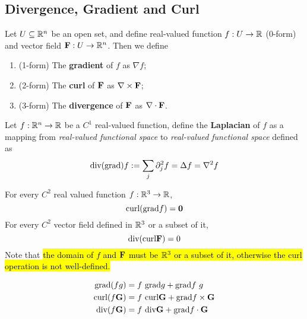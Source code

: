 \documentclass[11pt]{article}
\newcommand{\veG}[0]{\ve{G}}
\begin{document}
		\subsection{Divergence, Gradient and Curl}
			\begin{definition}
				Let $U \subseteq \mathbb{R}^n$ be an open set, and define real-valued function $f: U \to \mathbb{R}$ (0-form) and vector field $\textbf{F}: U \to \mathbb{R}^n$. Then we define
				\begin{enumerate}
					\item (1-form) The \textbf{gradient} of $f$ as $\nabla f$;
					\item (2-form) The \textbf{curl} of $\textbf{F}$ as $\nabla \times \textbf{F}$;
					\item (3-form) The \textbf{divergence} of $\textbf{F}$ as $\nabla \cdot \textbf{F}$.
				\end{enumerate}
			\end{definition}
			
			\begin{definition}
				Let $f: \mathbb{R}^n \to \mathbb{R}$ be a $C^1$ real-valued function, define the \textbf{Laplacian} of $f$ as a mapping from \emph{real-valued functional space} to \emph{real-valued functional space} defined as
				\begin{equation}
					\text{{div(grad)}} f := \sum_{j} \partial_j^2 f = \Delta f = \nabla^2 f
				\end{equation}
			\end{definition}
			
			\begin{theorem}
				For every $C^2$ real valued function $f: \mathbb{R}^3 \to \mathbb{R}$,
				\begin{equation}
					\text{curl}(\text{grad} f) = \textbf{0}
				\end{equation}
				For every $C^2$ vector field defined in $\mathbb{R}^3$ or a subset of it, 
				\begin{equation}
					\text{div} (\text{curl} \textbf{F}) = 0
				\end{equation}
				Note that \hl{the domain of $f$ and $\textbf{F}$ must be $\mathbb{R}^3$ or a subset of it, otherwise the curl operation is not well-defined.}\\
			\end{theorem}
			
			\begin{theorem}
				\begin{align}
					\grad (fg) &= f\ \grad g + \grad f\ g \\
					\curl (f \ve{G}) &= f\ \curl{\veG} + \grad f \times \ve{G} \\
					\dive (f \ve{G}) &= f\ \dive{\veG} + \grad f \cdot \ve{G}
				\end{align}
			\end{theorem}
			
\end{document}
